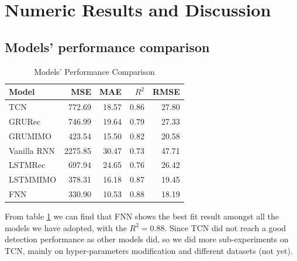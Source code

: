 \section{Numeric Results and Discussion}

\subsection{Models' performance comparison}
\begin{table}[H]
\centering
\caption{Models' Performance Comparison}
\begin{tabular}{l r r r r}
\toprule
\textbf{Model} & \textbf{MSE} & \textbf{MAE} & \textbf{$R^2$}& \textbf{RMSE}\\
\midrule
TCN & 772.69& 18.57& 0.86& 27.80\\
GRU\-Rec & 746.99& 19.64& 0.79& 27.33 \\
GRU\-MIMO& 423.54& 15.50& 0.82& 20.58 \\
Vanilla RNN& 2275.85& 30.47& 0.73& 47.71 \\
LSTM\-Rec & 697.94& 24.65& 0.76& 26.42 \\
LSTM\-MIMO & 378.31& 16.18& 0.87& 19.45 \\
FNN & 330.90& 10.53& \color{red}0.88& 18.19 \\
\bottomrule
\end{tabular}
\label{tab:models}
\end{table}

From table \ref{tab:models} we can find that FNN shows the best fit result amongst all the models we have adopted, with the $R^2 = 0.88$. Since TCN did not reach a good detection performance as other models did, so we did more sub-experiments on TCN, mainly on hyper-parameters modification and different datasets (not yet).

